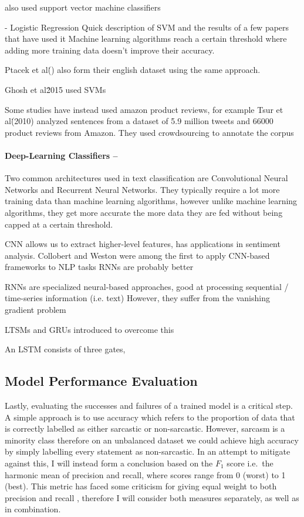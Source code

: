 \documentclass[12pt,a4paper]{article}
\begin{document}
\cite{ptavcek2014sarcasm} also used support vector machine classifiers
 
- Logistic Regression
Quick description of SVM and the results of a few papers that have used it
Machine learning algorithms reach a certain threshold where adding more training data doesn't improve their accuracy.


Ptacek et al\. () also form their english dataset using the same approach.

Ghosh et al\. 2015 used SVMs


Some studies have instead used amazon product reviews, for example Tsur et al\. (2010) analyzed sentences from a dataset of 5.9 million tweets and 66000 product reviews from Amazon. They used crowdsourcing to annotate the corpus



\paragraph{Deep-Learning Classifiers --}
Two common architectures used in text classification are Convolutional Neural Networks and Recurrent Neural Networks. They typically require a lot more training data than machine learning algorithms, however unlike machine learning algorithms, they get more accurate the more data they are fed without being capped at a certain threshold.

CNN allows us to extract higher-level features, has applications in sentiment analysis. Collobert and Weston were among the first to apply CNN-based frameworks to NLP tasks
RNNs are probably better

RNNs are specialized neural-based approaches, good at processing sequential / time-series information (i.e. text)
However, they suffer from the vanishing gradient problem

LTSMs and GRUs introduced to overcome this

An LSTM consists of three gates, 




\newpage


\subsection{Model Performance Evaluation}
\noindent Lastly, evaluating the successes and failures of a trained model is a critical step. A simple approach is to use accuracy which refers to the proportion of data that is correctly labelled as either sarcastic or non-sarcastic. However, sarcasm is a minority class therefore on an unbalanced dataset we could achieve high accuracy by simply labelling every statement as non-sarcastic. In an attempt to mitigate against this, I will instead form a conclusion based on the $F_{1}$ score i.e.\ the harmonic mean of precision and recall, where scores range from 0 (worst) to 1 (best). This metric has faced some criticism for giving equal weight to both precision and recall \cite{hand2018note}, therefore I will consider both measures separately, as well as in combination.
\end{document}
